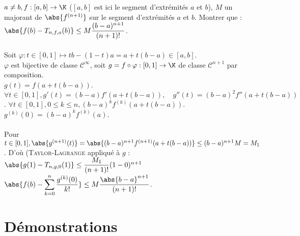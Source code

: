 \documentclass[12pt,a4paper]{report}
\begin{document}
\begin{demo}
$a \ne b, f : [a,b] \to \K$ ($[a,b]$ est ici le segment d'extrémités $a$ et $b$), $M$ un majorant de $\abs{f^{(n+1)}}$ sur le segment d'extrémités $a$ et $b$. Montrer que : \\
$\abs{f(b)-T_{n,f,a}(b)} \le M \dfrac{(b-a)^{n+1}}{(n+1)!}$. \\ \\
Soit $\varphi : t \in [0,1] \mapsto tb - (1-t)a = a + t(b-a) \in [a,b]$. \\
$\varphi$ est bijective de classe $\mathcal{C}^{\infty}$, soit $g = f \circ \varphi : [0,1] \to \K$ de classe $\mathcal{C}^{n+1}$ par composition. \\
$g(t) = f(a+t(b-a))$. \\
$\forall t \in [0,1], g'(t) = (b-a)f'(a+t(b-a)), \quad g''(t) = (b-a)^2 f''(a+t(b-a))$.
$\forall t \in [0,1], 0 \le k \le n, (b-a)^k f^{(k)}(a+t(b-a))$. \\
$g^{(k)}(0) = (b-a)^k f^{(k)}(a)$. \\ \\
Pour $t \in [0,1], \abs{g^{(n+1)}(t)} = \abs{(b-a)^{n+1}f^{(n+1)}(a+t(b-a))} \le (b-a)^{n+1}M = M_1$.
D'où (\textsc{Taylor-Lagrange} appliqué à $g$ : $\abs{g(1) - T_{n,g,0}(1)} \le \dfrac{M_1}{(n+1)!}(1-0)^{n+1}$ \ie $\abs{f(b) - \displaystyle{\sum_{k=0}^{n} \dfrac{g^{(k)}(0)}{k!}}} \le M \dfrac{\abs{b-a}^{n+1}}{(n+1)!}$.
\end{demo}

\section*{Démonstrations}
\end{document}
